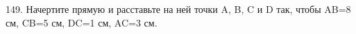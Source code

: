 149. Начертите прямую и расставьте на ней точки A, B, C и D так, чтобы AB=8 см, CB=5 см, DC=1 см, AC=3 см.\\
